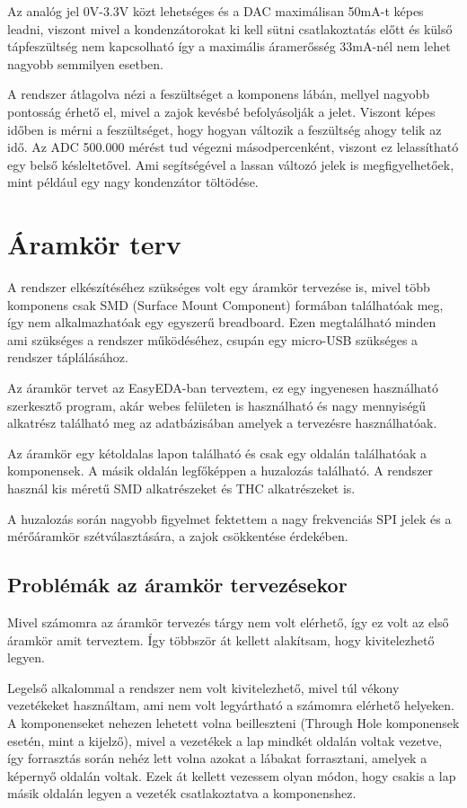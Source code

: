 Az analóg jel 0V-3.3V közt lehetséges és a DAC maximálisan 50mA-t képes leadni, viszont
mivel a kondenzátorokat ki kell sütni csatlakoztatás előtt és külső tápfeszültség nem 
kapcsolható így a maximális áramerősség 33mA-nél nem lehet nagyobb semmilyen esetben.

A rendszer átlagolva nézi a feszültséget a komponens lábán, mellyel nagyobb pontosság
érhető el, mivel a zajok kevésbé befolyásolják a jelet. Viszont képes időben is mérni
a feszültséget, hogy hogyan változik a feszültség ahogy telik az idő. Az ADC 500.000 mérést
tud végezni másodpercenként, viszont ez lelassítható egy belső késleltetővel. Ami segítségével
a lassan változó jelek is megfigyelhetőek, mint például egy nagy kondenzátor töltödése.


\section{Áramkör terv}

A rendszer elkészítéséhez szükséges volt egy áramkör tervezése is, mivel több komponens
csak SMD (Surface Mount Component) formában találhatóak meg, így nem alkalmazhatóak egy
egyszerű breadboard. Ezen megtalálható minden ami szükséges a rendszer működéséhez, 
csupán egy micro-USB szükséges a rendszer táplálásához.

Az áramkör tervet az EasyEDA-ban terveztem, ez egy ingyenesen használható szerkesztő
program, akár webes felületen is használható és nagy mennyiségű alkatrész található
meg az adatbázisában amelyek a tervezésre használhatóak.

Az áramkör egy kétoldalas lapon található és csak egy oldalán találhatóak a komponensek.
A másik oldalán legfőképpen a huzalozás található. A rendszer használ kis méretű
SMD alkatrészeket és THC alkatrészeket is. 

A huzalozás során nagyobb figyelmet fektettem a nagy frekvenciás SPI jelek
és a mérőáramkör szétválasztására, a zajok csökkentése érdekében.

\subsection{Problémák az áramkör tervezésekor}

Mivel számomra az áramkör tervezés tárgy nem volt elérhető, így ez volt az első 
áramkör amit terveztem. Így többször át kellett alakítsam, hogy kivitelezhető legyen.

Legelső alkalommal a rendszer nem volt kivitelezhető, mivel túl vékony vezetékeket
használtam, ami nem volt legyártható a számomra elérhető helyeken. A komponenseket 
nehezen lehetett volna beilleszteni (Through Hole komponensek esetén, mint a kijelző),
mivel a vezetékek a lap mindkét oldalán voltak vezetve, így forrasztás során nehéz
lett volna azokat a lábakat forrasztani, amelyek a képernyő oldalán voltak.
Ezek át kellett vezessem olyan módon, hogy csakis a lap másik oldalán legyen a vezeték
csatlakoztatva a komponenshez.

